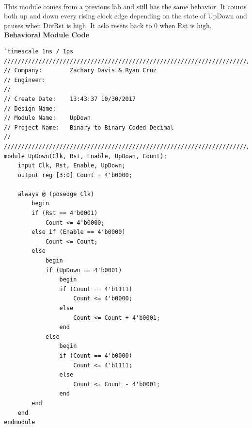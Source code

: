\documentclass[12pt]{report}
\begin{document}
		\paragraph*{}
		This module comes from a previous lab and still has the same behavior.  It counts both up and down every rising clock edge depending on the state of UpDown and pauses when DivRst is high.  It aslo resets back to 0 when Rst is high.
		\vspace{0.3cm}\\
		\textbf{Behavioral Module Code}
			\begin{Verbatim}[frame=single, fontsize=\small]
`timescale 1ns / 1ps
////////////////////////////////////////////////////////////////////////////////
// Company:        Zachary Davis & Ryan Cruz
// Engineer: 
// 
// Create Date:    13:43:37 10/30/2017 
// Design Name: 
// Module Name:    UpDown
// Project Name:   Binary to Binary Coded Decimal
//
////////////////////////////////////////////////////////////////////////////////
module UpDown(Clk, Rst, Enable, UpDown, Count);
	input Clk, Rst, Enable, UpDown;
	output reg [3:0] Count = 4'b0000;
	
	always @ (posedge Clk)
		begin
		if (Rst == 4'b0001)
			Count <= 4'b0000;
		else if (Enable == 4'b0000)
			Count <= Count;
		else
			begin
			if (UpDown == 4'b0001)
				begin
				if (Count == 4'b1111)
					Count <= 4'b0000;
				else
					Count <= Count + 4'b0001;
				end
			else
				begin
				if (Count == 4'b0000)
					Count <= 4'b1111;
				else
					Count <= Count - 4'b0001;
				end
		end
	end
endmodule
			\end{Verbatim}

				\paragraph*{}
			
\end{document}

